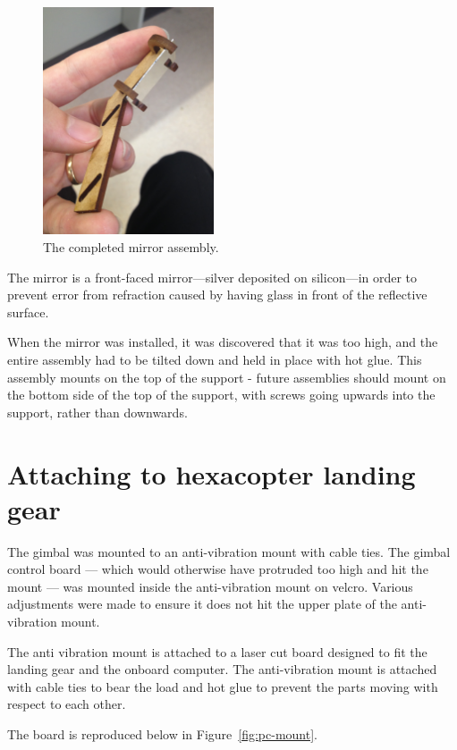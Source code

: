 \documentclass[12pt,oneside,a4paper]{book}
\begin{document}
\begin{figure}
  \centering
  \includegraphics[width=0.45\textwidth]{figs/mirror}
  \caption{The completed mirror assembly.}
  \label{fig:mirror}
\end{figure}

The mirror is a front-faced mirror---silver deposited on silicon---in
order to prevent error from refraction caused by having glass in front
of the reflective surface.

When the mirror was installed, it was discovered that it was too high,
and the entire assembly had to be tilted down and held in place with
hot glue. This assembly mounts on the top of the support - future
assemblies should mount on the bottom side of the top of the support,
with screws going upwards into the support, rather than downwards.

\section{Attaching to hexacopter landing gear}
\label{sec:attach-hexac-land}

The gimbal was mounted to an anti-vibration mount with cable
ties. The gimbal control board --- which would otherwise have
protruded too high and hit the mount --- was mounted inside the
anti-vibration mount on velcro. Various adjustments were made to
ensure it does not hit the upper plate of the anti-vibration mount.

The anti vibration mount is attached to a laser cut board designed to
fit the landing gear and the onboard computer. The anti-vibration
mount is attached with cable ties to bear the load and hot glue to
prevent the parts moving with respect to each other.

The board is reproduced below in Figure~\ref{fig:pc-mount}.
\end{document}
